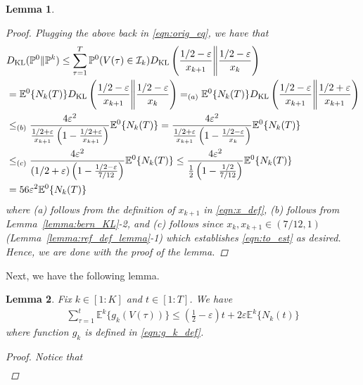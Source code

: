 \documentclass[12pt,draftcls, onecolumn]{IEEEtran}
\newtheorem{lemma}{Lemma}
\begin{document}
{\begin{lemma}
\begin{proof}
Plugging the above back in \eqref{eqn:orig_eq}, we have that
\begin{align}
    &D_{\text{KL}}(\mathbb{P}^0\lVert \mathbb{P}^k) \leq \sum_{\tau = 1}^T \mathbb{P}^0(V(\tau) \in  \mathcal{I}_k)D_{\text{KL}}\left(\frac{1/2 - \varepsilon}{x_{k+1}}\Bigg{\lVert} \frac{1/2 -\varepsilon}{x_k}\right)  \nonumber\\&= \mathbb{E}^0\{N_k(T)\}D_{\text{KL}}\left(\frac{1/2 - \varepsilon}{x_{k+1}}\Bigg{\lVert} \frac{1/2 -\varepsilon}{x_{k}}\right) =_{(a)} \mathbb{E}^0\{N_k(T)\}D_{\text{KL}}\left(\frac{1/2 - \varepsilon}{x_{k+1}}\Bigg{\lVert} \frac{1/2 +\varepsilon}{x_{k+1}}\right)\nonumber\\&\leq _{(b)} \frac{4\varepsilon^2}{ \frac{1/2 +\varepsilon}{x_{k+1}}\left(1- \frac{1/2 +\varepsilon}{x_{k+1}}\right)}\mathbb{E}^0\{N_k(T)\}=\frac{4\varepsilon^2}{ \frac{1/2 +\varepsilon}{x_{k+1}}\left(1- \frac{1/2 -\varepsilon}{x_{k}}\right)}\mathbb{E}^0\{N_k(T)\} \nonumber\\&\leq_{(c)} \frac{4\varepsilon^2}{ (1/2 +\varepsilon)\left(1- \frac{1/2- \varepsilon}{7/12}\right)}\mathbb{E}^0\{N_k(T)\} \leq \frac{4\varepsilon^2}{ \frac{1}{2}\left(1- \frac{1/2 }{7/12}\right)}\mathbb{E}^0\{N_k(T)\} \nonumber\\&= 56 \varepsilon^2\mathbb{E}^0\{N_k(T)\} \nonumber
\end{align}
where (a) follows from the definition of $x_{k+1}$ in \eqref{eqn:x_def},  (b) follows from Lemma~\ref{lemma:bern_KL}-2, and (c) follows since $x_k,x_{k+1} \in (7/12,1)$ (Lemma~\ref{lemma:ref_def_lemma}-1) which establishes \eqref{eqn:to_est} as desired. Hence, we are done with the proof of the lemma.
\end{proof}
\end{lemma}
Next, we have the following lemma.
\begin{lemma}\label{lemma:service_bound}
Fix $k \in [1:K]$ and $t \in [1:T]$. We have
\begin{align}
    \sum_{\tau = 1}^t \mathbb{E}^k\{g_k(V(\tau))\} \leq \left(\frac{1}{2}-\varepsilon \right)t + 2\varepsilon \mathbb{E}^k\{N_k(t)\} \nonumber
\end{align}
where function $g_k$ is defined in \eqref{eqn:g_k_def}.
\begin{proof}
Notice that
\begin{align}\label{eqn:0101010}

\end{align}
\end{proof}
\end{lemma}}
\end{document}
